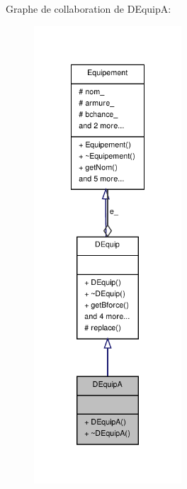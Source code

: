 Graphe de collaboration de D\-Equip\-A\-:
\nopagebreak
\begin{figure}[H]
\begin{center}
\leavevmode
\includegraphics[width=156pt]{class_d_equip_a__coll__graph}
\end{center}
\end{figure}

